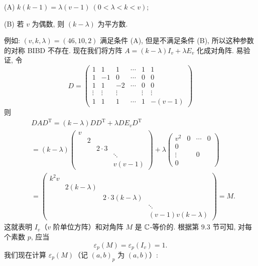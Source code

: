 (A) $k(k-1)=\lambda(v-1)\ (0<\lambda<k<v)$;

(B) 若 $v$ 为偶数, 则 $(k-\lambda)$ 为平方数.

例如: $(v,k,\lambda)=(46,10,2)$ 满足条件 (A), 但是不满足条件 (B), 所以这种参数的对称 BIBD 不存在. 现在我们将方阵 $A=(k-\lambda)I_v+\lambda E_v$ 化成对角阵. 易验证, 令
\[
  D=\left(\begin{array}{cccccc}
    1 & 1 & 1 & \cdots & 1 & 1\\
    1 & -1 & 0 & \cdots & 0 & 0\\
    1 & 1 & -2 & \cdots & 0 & 0\\
    \vdots & \vdots & \vdots & & \vdots & \vdots\\
    1 & 1 & 1 & \cdots & 1 & -(v-1)
  \end{array}\right)
\]
则
\[
  \begin{aligned}
    &DAD^{\mathrm{T}}=(k-\lambda)DD^{\mathrm{T}}+\lambda DE_vD^{\mathrm{T}}\\
    &=(k-\lambda)
    \left(\begin{array}{cccc}v& & &\\ & 2 & &\\ & & 2\cdot 3 &\\ & & & \ddots\\ & & & v(v-1)\end{array}\right)
    +\lambda
    \left(\begin{array}{cccc}v^2&0&\cdots&0\\ 0& & &\\ \vdots& & 0&\\ 0& & &\end{array}\right)\\
    &=
    \left(\begin{array}{cccc}k^2v& & &\\ & 2(k-\lambda) & &\\ & & 2\cdot 3(k-\lambda) &\\ & & & \ddots\\ & & & (v-1)v(k-\lambda)\end{array}\right)
    =M.
  \end{aligned}
\]
这就表明 $I_v$（$v$ 阶单位方阵）和对角阵 $M$ 是 $\mathbb{C}$-等价的. 根据第 $9.3$ 节可知, 对每个素数 $p$, 应当
\[
  \varepsilon_p(M)=\varepsilon_p(I_v)=1.
\]
我们现在计算 $\varepsilon_p(M)$（记 $(a,b)_p$ 为 $(a,b)$）:
